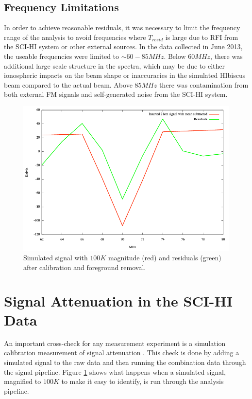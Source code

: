 \subsection{Frequency Limitations}

In order to achieve reasonable residuals, it was necessary to limit the frequency range of the analysis to avoid frequencies where $T_{resid}$ is large due to RFI from the SCI-HI system or other external sources. In the data collected in June 2013, the useable frequencies were limited to $\sim 60-85 MHz$. Below $60 MHz$, there was additional large scale structure in the spectra, which may be due to either ionospheric impacts on the beam shape or inaccuracies in the simulated HIbiscus beam compared to the actual beam. Above $85 MHz$ there was contamination from both external FM signals and self-generated noise from the SCI-HI system. 

\begin{figure}[htb]
\begin{center}
\includegraphics[width=0.9\linewidth]{Data_analysis/figures/100_K_21cm_signal.png}
\caption{Simulated \cm signal with $100 K$ magnitude (red) and residuals (green) after calibration and foreground removal. }
\label{Fig:100K_sim}
\end{center}
\end{figure}



\section{\cm Signal Attenuation in the SCI-HI Data}

An important cross-check for any \cm measurement experiment is a simulation calibration measurement of signal attenuation \cite{paciga_2013}. This check is done by adding a simulated \cm signal to the raw data and then running the combination data through the signal pipeline. Figure \ref{Fig:100K_sim} shows what happens when a simulated \cm signal, magnified to $100 K$ to make it easy to identify, is run through the analysis pipeline. 

